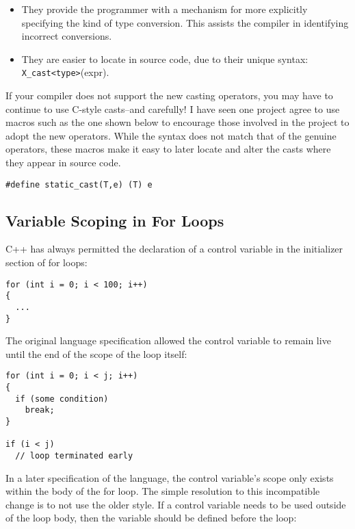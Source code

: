 \begin{itemize}
\item They provide the programmer with a mechanism for more explicitly specifying the kind of type conversion. This assists the compiler in identifying incorrect conversions.
\item They are easier to locate in source code, due to their unique 
syntax: \verb+X_cast<type>+(expr).
\end{itemize}

If your compiler does not support the new casting operators, you may have to 
continue to use C-style casts--and carefully! I have seen one project agree 
to use macros such as the one shown below to encourage those involved in the 
project to adopt the new operators. While the syntax does not match that of 
the genuine operators, these macros make it easy to later locate and alter 
the casts where they appear in source code.

 	


\begin{Verbatim}[frame=single]
#define static_cast(T,e) (T) e
\end{Verbatim}

\subsection{Variable Scoping in For Loops}

C++ has always permitted the declaration of a control variable in the initializer section of for loops:

 	
\begin{verbatim}
for (int i = 0; i < 100; i++)
{
  ...
}
\end{verbatim}

The original language specification allowed the control variable to remain live until the end of the scope of the loop itself: 

\begin{Verbatim}[frame=single]
for (int i = 0; i < j; i++)
{
  if (some condition)
    break;
}

if (i < j)
  // loop terminated early
\end{Verbatim}

In a later specification of the language, the control variable's scope only exists within the body of the for loop. The simple resolution to this incompatible change is to not use the older style. If a control variable needs to be used outside of the loop body, then the variable should be defined before the loop:

